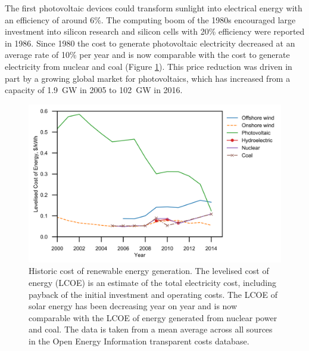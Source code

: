 The first photovoltaic devices could transform sunlight into electrical energy with an efficiency of around 6\%. The computing boom of the 1980s encouraged large investment into silicon research and  silicon cells with 20\% efficiency were reported in 1986.\autocite{Blakers1986} Since 1980 the cost to generate photovoltaic electricity decreased at an average rate of 10\% per year\autocite{Farmer2016} and is now comparable with the cost to generate electricity from nuclear and coal (Figure \ref{module_price}). This price reduction was driven in part by a growing global market for photovoltaics, which has increased from a capacity of \SI{1.9}{\giga\watt} in 2005 to \SI{102}{\giga\watt} in 2016.\autocite{Jager-Waldau2017}

\begin{figure}[h]
\centering
  \includegraphics[width=1.0\columnwidth]{figures/ch1/solarcost.png}
  \caption[Historic cost of renewable energy generation]{Historic cost of renewable energy generation. The levelised cost of energy (LCOE) is an estimate of the total electricity cost, including payback of the initial investment and operating costs. The LCOE of solar energy has been decreasing year on year and is now comparable with the LCOE of energy generated from nuclear power and coal. The data is taken from a mean average across all sources in the Open Energy Information transparent costs database.\autocite{OpenEI}}
  \label{module_price}
\end{figure}

